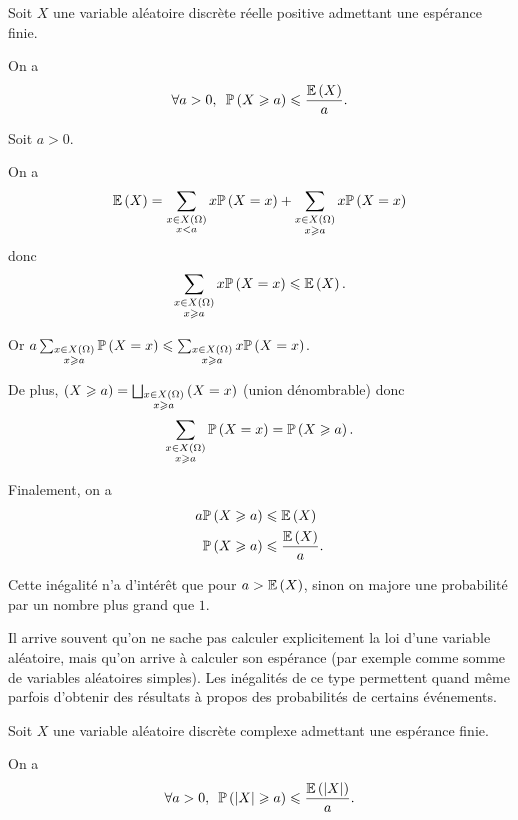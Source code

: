 \begin{prop}
Soit \(X\) une variable aléatoire discrète réelle positive admettant une espérance finie.

On a \[\quantifs{\forall a>0}\proba{X\geq a}\leq\dfrac{\esp{X}}{a}.\]
\end{prop}

\begin{dem}
Soit \(a>0\).

On a \[\operatorname{\mathbb{E}}\left(X\right)=\sum_{\substack{x\in X\left(\Omega\right) \\ x<a}}x\mathbb{P}\left(X=x\right)+\sum_{\substack{x\in X\left(\Omega\right) \\ x\geqslant a}}x\mathbb{P}\left(X=x\right)\] donc \[\sum_{\substack{x\in X\left(\Omega\right) \\ x\geqslant a}}x\mathbb{P}\left(X=x\right)\leqslant\operatorname{\mathbb{E}}\left(X\right).\]

Or \(a\sum_{\substack{x\in X\left(\Omega\right) \\ x\geqslant a}}\mathbb{P}\left(X=x\right)\leqslant\sum_{\substack{x\in X\left(\Omega\right) \\ x\geqslant a}}x\mathbb{P}\left(X=x\right)\).

De plus, \(\left(X\geqslant a\right)=\bigsqcup_{\substack{x\in X\left(\Omega\right) \\ x\geqslant a}}\left(X=x\right)\) (union dénombrable) donc \[\sum_{\substack{x\in X\left(\Omega\right) \\ x\geqslant a}}\mathbb{P}\left(X=x\right)=\mathbb{P}\left(X\geqslant a\right).\]

Finalement, on a \[\begin{aligned}
a\mathbb{P}\left(X\geqslant a\right)&\leqslant\operatorname{\mathbb{E}}\left(X\right) \\
\mathbb{P}\left(X\geqslant a\right)&\leqslant\dfrac{\operatorname{\mathbb{E}}\left(X\right)}{a}.
\end{aligned}\]
\end{dem}

Cette inégalité n'a d'intérêt que pour \(a>\operatorname{\mathbb{E}}\left(X\right)\), sinon on majore une probabilité par un nombre plus grand que \(1\).

Il arrive souvent qu'on ne sache pas calculer explicitement la loi d'une variable aléatoire, mais qu'on arrive à calculer son espérance (par exemple comme somme de variables aléatoires simples). Les inégalités de ce type permettent quand même parfois d'obtenir des résultats à propos des probabilités de certains événements.

\begin{cor}
Soit \(X\) une variable aléatoire discrète complexe admettant une espérance finie.

On a \[\quantifs{\forall a>0}\proba{\abs{X}\geq a}\leq\dfrac{\esp{\abs{X}}}{a}.\]
\end{cor}

